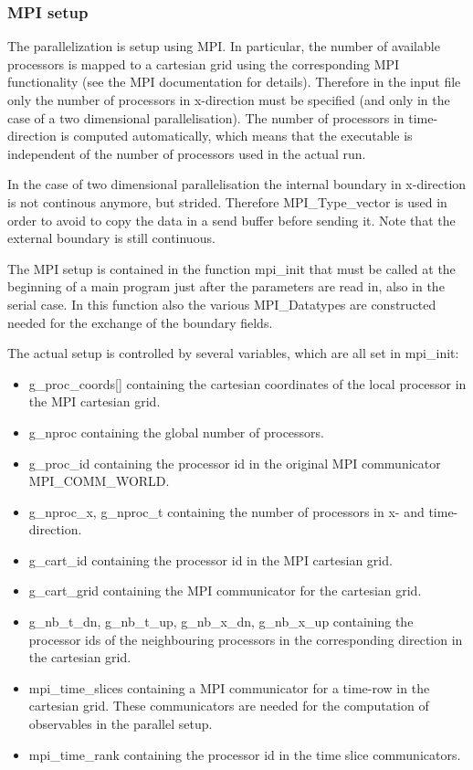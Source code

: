 \subsubsection{MPI setup}

The parallelization is setup using MPI. In particular, the number of
available processors is mapped to a cartesian grid using the
corresponding MPI functionality (see the MPI documentation for
details). Therefore in the input file only the number of processors in
x-direction must be specified (and only in the case of a two
dimensional parallelisation). The number of processors in
time-direction is computed automatically, which means that the
executable is independent of the number of processors used in the
actual run.

In the case of two dimensional parallelisation the internal boundary
in x-direction is not continous anymore, but strided. Therefore
{\ttfamily MPI\_Type\_vector} is used in order to avoid to copy the data
in a send buffer before sending it. Note that the external boundary is
still continuous.

The MPI setup is contained in the function {\ttfamily mpi\_init} that
must be called at the beginning of a main program just after the
parameters are read in, also in the serial case. In this function also
the various {\ttfamily MPI\_Datatype}s are constructed needed for the
exchange of the boundary fields.

The actual setup is controlled by several variables, which are all set
in {\ttfamily mpi\_init}:
\begin{itemize}
\item {\ttfamily g\_proc\_coords[]} containing the cartesian
  coordinates of the local processor in the MPI cartesian grid.
\item {\ttfamily g\_nproc} containing the global number of processors.
\item {\ttfamily g\_proc\_id} containing the processor id in the
  original MPI communicator {\ttfamily MPI\_COMM\_WORLD}.
\item {\ttfamily g\_nproc\_x, g\_nproc\_t} containing the number of
  processors in x- and time-direction.
\item {\ttfamily g\_cart\_id} containing the processor id in the MPI
  cartesian grid.
\item {\ttfamily g\_cart\_grid} containing the MPI communicator for
  the cartesian grid.
\item {\ttfamily g\_nb\_t\_dn}, {\ttfamily g\_nb\_t\_up}, {\ttfamily
    g\_nb\_x\_dn}, {\ttfamily g\_nb\_x\_up} containing the processor
  ids of the neighbouring processors in the corresponding direction in
  the cartesian grid.
\item {\ttfamily mpi\_time\_slices} containing a MPI communicator
  for a time-row in the cartesian grid. These communicators are needed
  for the computation of observables in the parallel setup.
\item {\ttfamily mpi\_time\_rank} containing the processor id in the
  time slice communicators.
\end{itemize}

